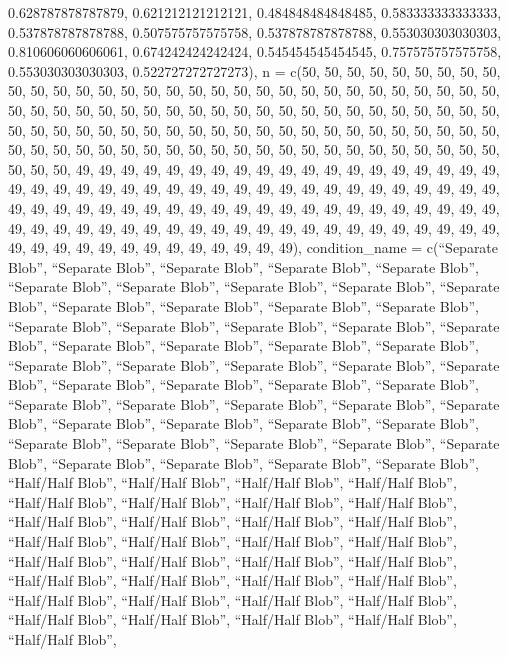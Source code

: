 \documentclass[
  man,floatsintext]{apa6}
\begin{document}
0.628787878787879, 0.621212121212121, 0.484848484848485, 0.583333333333333, 0.537878787878788, 0.507575757575758, 0.537878787878788, 0.553030303030303, 0.810606060606061, 0.674242424242424, 0.545454545454545, 0.757575757575758, 0.553030303030303, 0.522727272727273), n = c(50, 50, 50, 50, 50, 50, 50, 50, 50, 50, 50, 50, 50, 50, 50, 50, 50, 50, 50, 50, 50, 50, 50, 50, 50, 50, 50, 50, 50, 50, 50, 50, 50, 50, 50, 50, 50, 50, 50, 50, 50, 50, 50, 50, 50, 50, 50, 50, 50, 50, 50, 50, 50, 50, 50, 50, 50,
50, 50, 50, 50, 50, 50, 50, 50, 50, 50, 50, 50, 50, 50, 50, 50, 50, 50, 50, 50, 50, 50, 50, 50, 50, 50, 50, 50, 50, 50, 50, 50, 50, 50, 50, 50, 50, 50, 50, 50, 50, 50, 50, 49, 49, 49, 49, 49, 49, 49, 49, 49, 49, 49, 49, 49, 49, 49, 49, 49, 49, 49, 49, 49, 49, 49, 49, 49, 49, 49, 49, 49, 49, 49, 49, 49, 49, 49, 49, 49, 49, 49, 49, 49, 49, 49, 49, 49, 49, 49, 49, 49, 49, 49, 49, 49, 49, 49, 49, 49, 49, 49, 49, 49, 49, 49, 49, 49, 49, 49, 49, 49, 49, 49, 49, 49, 49, 49, 49, 49, 49, 49, 49, 49, 49, 49,
49, 49, 49, 49, 49, 49, 49, 49, 49, 49, 49, 49, 49, 49, 49), condition\_name = c(``Separate Blob'', ``Separate Blob'', ``Separate Blob'', ``Separate Blob'', ``Separate Blob'', ``Separate Blob'', ``Separate Blob'', ``Separate Blob'', ``Separate Blob'', ``Separate Blob'', ``Separate Blob'', ``Separate Blob'', ``Separate Blob'', ``Separate Blob'', ``Separate Blob'', ``Separate Blob'', ``Separate Blob'', ``Separate Blob'', ``Separate Blob'', ``Separate Blob'', ``Separate Blob'', ``Separate Blob'', ``Separate Blob'', ``Separate Blob'', ``Separate Blob'',
``Separate Blob'', ``Separate Blob'', ``Separate Blob'', ``Separate Blob'', ``Separate Blob'', ``Separate Blob'', ``Separate Blob'', ``Separate Blob'', ``Separate Blob'', ``Separate Blob'', ``Separate Blob'', ``Separate Blob'', ``Separate Blob'', ``Separate Blob'', ``Separate Blob'', ``Separate Blob'', ``Separate Blob'', ``Separate Blob'', ``Separate Blob'', ``Separate Blob'', ``Separate Blob'', ``Separate Blob'', ``Separate Blob'', ``Separate Blob'', ``Separate Blob'', ``Half/Half Blob'', ``Half/Half Blob'', ``Half/Half Blob'', ``Half/Half Blob'', ``Half/Half Blob'',
``Half/Half Blob'', ``Half/Half Blob'', ``Half/Half Blob'', ``Half/Half Blob'', ``Half/Half Blob'', ``Half/Half Blob'', ``Half/Half Blob'', ``Half/Half Blob'', ``Half/Half Blob'', ``Half/Half Blob'', ``Half/Half Blob'', ``Half/Half Blob'', ``Half/Half Blob'', ``Half/Half Blob'', ``Half/Half Blob'', ``Half/Half Blob'', ``Half/Half Blob'', ``Half/Half Blob'', ``Half/Half Blob'', ``Half/Half Blob'', ``Half/Half Blob'', ``Half/Half Blob'', ``Half/Half Blob'', ``Half/Half Blob'', ``Half/Half Blob'', ``Half/Half Blob'', ``Half/Half Blob'', ``Half/Half Blob'',
\end{document}
